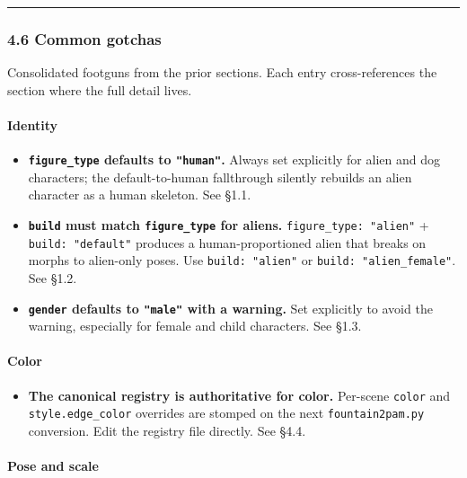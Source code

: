 \documentclass[
  12pt,
  letterpaper,
]{book}
\providecommand{\tightlist}{%
  \setlength{\itemsep}{0pt}\setlength{\parskip}{0pt}}
\begin{document}
\begin{center}\rule{0.5\linewidth}{0.5pt}\end{center}

\subsubsection{4.6 Common gotchas}\label{common-gotchas}

Consolidated footguns from the prior sections. Each entry
cross-references the section where the full detail lives.

\paragraph{Identity}\label{identity}

\begin{itemize}
\tightlist
\item
  \textbf{\texttt{figure\_type} defaults to \texttt{"human"}.} Always
  set explicitly for alien and dog characters; the default-to-human
  fallthrough silently rebuilds an alien character as a human skeleton.
  See §1.1.
\item
  \textbf{\texttt{build} must match \texttt{figure\_type} for aliens.}
  \texttt{figure\_type:\ "alien"} + \texttt{build:\ "default"} produces
  a human-proportioned alien that breaks on morphs to alien-only poses.
  Use \texttt{build:\ "alien"} or \texttt{build:\ "alien\_female"}. See
  §1.2.
\item
  \textbf{\texttt{gender} defaults to \texttt{"male"} with a warning.}
  Set explicitly to avoid the warning, especially for female and child
  characters. See §1.3.
\end{itemize}

\paragraph{Color}\label{color-1}

\begin{itemize}
\tightlist
\item
  \textbf{The canonical registry is authoritative for color.} Per-scene
  \texttt{color} and \texttt{style.edge\_color} overrides are stomped on
  the next \texttt{fountain2pam.py} conversion. Edit the registry file
  directly. See §4.4.
\end{itemize}

\paragraph{Pose and scale}\label{pose-and-scale}
\end{document}
